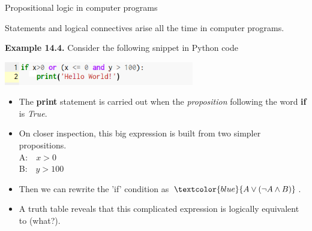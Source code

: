 \documentclass[aspectratio=169]{beamer}
\providecommand{\Blue}[1]{\textcolor{blue}{#1}}
\begin{document}
\begin{frame}[plain]{Propositional logic in computer programs}
 
  Statements and logical connectives arise all the time in computer programs. \pause 
  \medskip 
  
   {\bf Example 14.4.} Consider the following snippet in Python code
      \begin{center}
       \includegraphics[height=1cm]{./img/lecture14-fig3.png}
      \end{center}
    
    
    \begin{itemize}
      \item The {\bf print} statement is carried out when the \emph{proposition} following the word {\bf if}
        is \emph{True}.
      \item On closer inspection, this big expression is built from two simpler propositions.\\ \pause
         \hspace{.5in} A:\ \ $x > 0$ \\
         \hspace{.5in} B:\ \  $y > 100$\pause 
      \item Then we can rewrite the 'if' condition as $\Blue{A\vee (\neg A \wedge B)}$.
      \item A truth table reveals that this complicated expression is logically equivalent to (what?).
      
    \end{itemize}


\end{frame}
\end{document}
